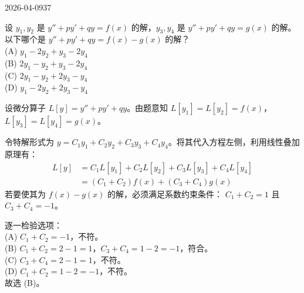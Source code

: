 \begin{mistake}{2026-04-09}{37}

\begin{problemcontent}
设 \( y_1, y_2 \) 是 \( y'' + py' + qy = f(x) \) 的解，\( y_3, y_4 \) 是 \( y'' + py' + qy = g(x) \) 的解。以下哪个是 \( y'' + py' + qy = f(x) - g(x) \) 的解？\\
(A) \( y_1 - 2y_2 + y_3 - 2y_4 \)\\
(B) \( 2y_1 - y_2 + y_3 - 2y_4 \)\\
(C) \( 2y_1 - y_2 + 2y_3 - y_4 \)\\
(D) \( y_1 - 2y_2 + 2y_3 - y_4 \)
\end{problemcontent}

\begin{solutioncontent}
设微分算子 \( L[y] = y'' + py' + qy \)。由题意知 \( L[y_1]=L[y_2]=f(x) \)，\( L[y_3]=L[y_4]=g(x) \)。

令特解形式为 \( y = C_1y_1 + C_2y_2 + C_3y_3 + C_4y_4 \)。将其代入方程左侧，利用线性叠加原理有：
\[
\begin{aligned}
L[y] &= C_1L[y_1] + C_2L[y_2] + C_3L[y_3] + C_4L[y_4] \\
&= (C_1+C_2)f(x) + (C_3+C_4)g(x)
\end{aligned}
\]
若要使其为 \( f(x) - g(x) \) 的解，必须满足系数约束条件：
\( C_1 + C_2 = 1 \) 且 \( C_3 + C_4 = -1 \)。

逐一检验选项：\\
(A) \( C_1+C_2 = -1 \)，不符。\\
(B) \( C_1+C_2 = 2-1=1 \)，\( C_3+C_4 = 1-2=-1 \)，符合。\\
(C) \( C_3+C_4 = 2-1=1 \)，不符。\\
(D) \( C_1+C_2 = 1-2=-1 \)，不符。\\
故选 (B)。
\end{solutioncontent}


\end{mistake}
